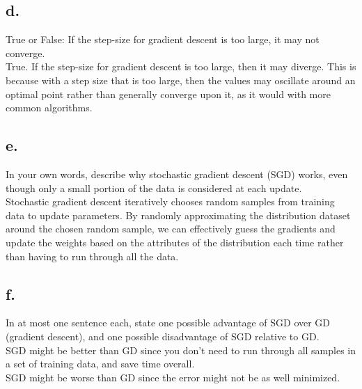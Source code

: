 \documentclass{article}
\newcommand{\1}{\mathbf{1}}
\begin{document}
{\subsection*{d.}

True or False: If the step-size for gradient descent is too large, it may not converge. \\

True. If the step-size for gradient descent is too large, then it may diverge. This is because with a step size that is too large, then the values may oscillate around an optimal point rather than generally converge upon it, as it would with more common algorithms.

\subsection*{e.}

In your own words, describe why stochastic gradient descent (SGD) works, even though only a small portion of the data is considered at each update. \\

Stochastic gradient descent iteratively chooses random samples from training data to update parameters. By randomly approximating the distribution dataset around the chosen random sample, we can effectively guess the gradients and update the weights based on the attributes of the distribution each time rather than having to run through all the data.

\subsection*{f.}

In at most one sentence each, state one possible advantage of SGD over GD (gradient descent), and one possible disadvantage of SGD relative to GD. \\

SGD might be better than GD since you don't need to run through all samples in a set of training data, and save time overall. \\ 
SGD might be worse than GD since the error might not be as well minimized.

}
\end{document}
